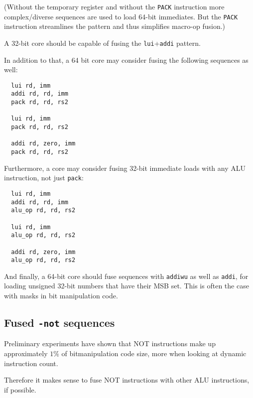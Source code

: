 (Without the temporary register and without the {\tt PACK} instruction more complex/diverse
sequences are used to load 64-bit immediates. But the {\tt PACK} instruction streamlines
the pattern and thus simplifies macro-op fusion.)

A 32-bit core should be capable of fusing the {\tt lui}+{\tt addi} pattern.

In addition to that, a 64 bit core may consider fusing the following sequences as well:

\begin{minipage}{\linewidth}
\begin{verbatim}
  lui rd, imm
  addi rd, rd, imm
  pack rd, rd, rs2

  lui rd, imm
  pack rd, rd, rs2

  addi rd, zero, imm
  pack rd, rd, rs2
\end{verbatim}
\end{minipage}

Furthermore, a core may consider fusing 32-bit immediate loads with any ALU
instruction, not just {\tt pack}:

\begin{minipage}{\linewidth}
\begin{verbatim}
  lui rd, imm
  addi rd, rd, imm
  alu_op rd, rd, rs2

  lui rd, imm
  alu_op rd, rd, rs2

  addi rd, zero, imm
  alu_op rd, rd, rs2
\end{verbatim}
\end{minipage}

And finally, a 64-bit core should fuse sequences with {\tt addiwu} as well as
{\tt addi}, for loading unsigned 32-bit numbers that have their MSB set. This is
often the case with masks in bit manipulation code.


\subsection{Fused {\tt *-not} sequences}

Preliminary experiments have shown that NOT instructions make up approximately
$1\%$ of bitmanipulation code size, more when looking at dynamic instruction count.~\cite{Wolf17A}

Therefore it makes sense to fuse NOT instructions with other ALU instructions, if possible.


